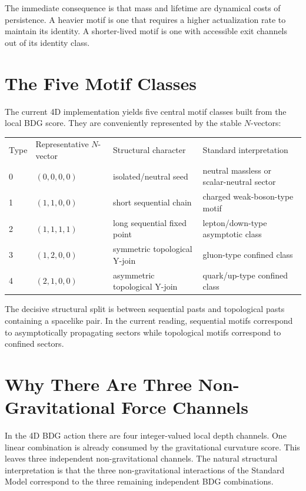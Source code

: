 \documentclass[11pt]{article}
\begin{document}
The immediate consequence is that mass and lifetime are dynamical costs of persistence. A heavier motif is one that requires a higher actualization rate to maintain its identity. A shorter-lived motif is one with accessible exit channels out of its identity class.

\section{The Five Motif Classes}
The current 4D implementation yields five central motif classes built from the local BDG score. They are conveniently represented by the stable $N$-vectors:
\begin{center}
\begin{tabular}{p{} p{} p{} p{}}
Type & Representative $N$-vector & Structural character & Standard interpretation\\
0 & $(0,0,0,0)$ & isolated/neutral seed & neutral massless or scalar-neutral sector\\
1 & $(1,1,0,0)$ & short sequential chain & charged weak-boson-type motif\\
2 & $(1,1,1,1)$ & long sequential fixed point & lepton/down-type asymptotic class\\
3 & $(1,2,0,0)$ & symmetric topological Y-join & gluon-type confined class\\
4 & $(2,1,0,0)$ & asymmetric topological Y-join & quark/up-type confined class\\
\end{tabular}
\end{center}

The decisive structural split is between sequential pasts and topological pasts containing a spacelike pair. In the current reading, sequential motifs correspond to asymptotically propagating sectors while topological motifs correspond to confined sectors.

\section{Why There Are Three Non-Gravitational Force Channels}
In the 4D BDG action there are four integer-valued local depth channels. One linear combination is already consumed by the gravitational curvature score. This leaves three independent non-gravitational channels. The natural structural interpretation is that the three non-gravitational interactions of the Standard Model correspond to the three remaining independent BDG combinations.
\end{document}
